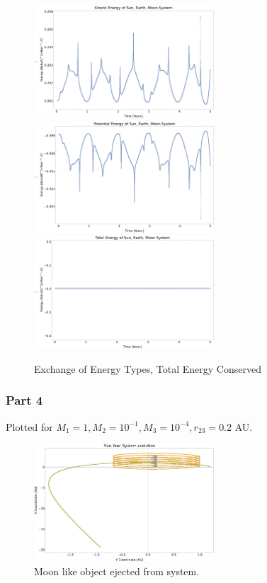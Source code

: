 \documentclass{article}
\begin{document}
\begin{figure}[!htb]
	\begin{center}
		\includegraphics[width=0.6\textwidth]{images/p1-3d.pdf}
		\includegraphics[width=0.6\textwidth]{images/p1-3e.pdf}
		\includegraphics[width=0.6\textwidth]{images/p1-3f.pdf}
	\end{center}
	\caption{Exchange of Energy Types, Total Energy Conserved}
\label{fig:qual}
\end{figure}
\FloatBarrier  

\subsubsection{Part 4}

Plotted for $M_1 = 1, M_2 = 10^{-1}, M_3 = 10^{-4}, r_{23} = 0.2$ AU. 

\begin{figure}[!htb]
	\begin{center}
		\includegraphics[width=0.6\textwidth]{images/p1-4a.pdf}
	\end{center}
	\caption{Moon like object ejected from system.}
\label{fig:qual}
\end{figure}
\FloatBarrier
\end{document}
